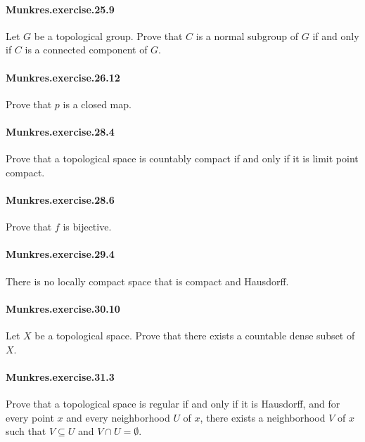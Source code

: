 \documentclass{article}
\begin{document}
\paragraph{Munkres.exercise.25.9} Let $G$ be a topological group. Prove that $C$ is a normal subgroup of $G$ if and only if $C$ is a connected component of $G$.

\paragraph{Munkres.exercise.26.12} Prove that $p$ is a closed map.

\paragraph{Munkres.exercise.28.4} Prove that a topological space is countably compact if and only if it is limit point compact.

\paragraph{Munkres.exercise.28.6} Prove that $f$ is bijective.

\paragraph{Munkres.exercise.29.4} There is no locally compact space that is compact and Hausdorff.

\paragraph{Munkres.exercise.30.10} Let $X$ be a topological space. Prove that there exists a countable dense subset of $X$.


\paragraph{Munkres.exercise.31.3} Prove that a topological space is regular if and only if it is Hausdorff, and for every point $x$ and every neighborhood $U$ of $x$, there exists a neighborhood $V$ of $x$ such that $V \subseteq U$ and $V \cap U = \emptyset$.
\end{document}
